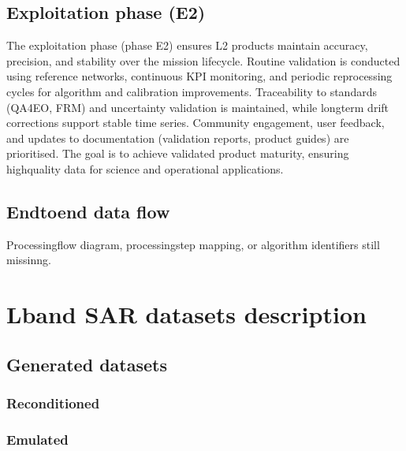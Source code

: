 \documentclass[a4paper,10pt,english]{sphinxmanual}
\begin{document}
\section{Exploitation phase (E2)}
\label{\detokenize{02_processing_model:exploitation-phase-e2}}
\sphinxAtStartPar
The exploitation phase (phase E2) ensures L2 products maintain accuracy,
precision, and stability over the mission lifecycle. Routine validation is
conducted using reference networks, continuous KPI monitoring, and periodic
reprocessing cycles for algorithm and calibration improvements. Traceability
to standards (QA4EO, FRM) and uncertainty validation is maintained, while
long\sphinxhyphen{}term drift corrections support stable time series. Community engagement,
user feedback, and updates to documentation (validation reports, product
guides) are prioritised. The goal is to achieve validated product maturity,
ensuring high\sphinxhyphen{}quality data for science and operational applications.


\section{End\sphinxhyphen{}to\sphinxhyphen{}end data flow}
\label{\detokenize{02_processing_model:end-to-end-data-flow}}
\sphinxAtStartPar
Processing\sphinxhyphen{}flow diagram, processing\sphinxhyphen{}step mapping, or algorithm
identifiers still missinng.

\sphinxstepscope


\chapter{L\sphinxhyphen{}band SAR datasets description}
\label{\detokenize{03_lband_sar_datasets:l-band-sar-datasets-description}}\label{\detokenize{03_lband_sar_datasets::doc}}

\section{Generated datasets}
\label{\detokenize{03_lband_sar_datasets:generated-datasets}}

\subsection{Reconditioned}
\label{\detokenize{03_lband_sar_datasets:reconditioned}}

\subsection{Emulated}
\label{\detokenize{03_lband_sar_datasets:emulated}}
\end{document}
